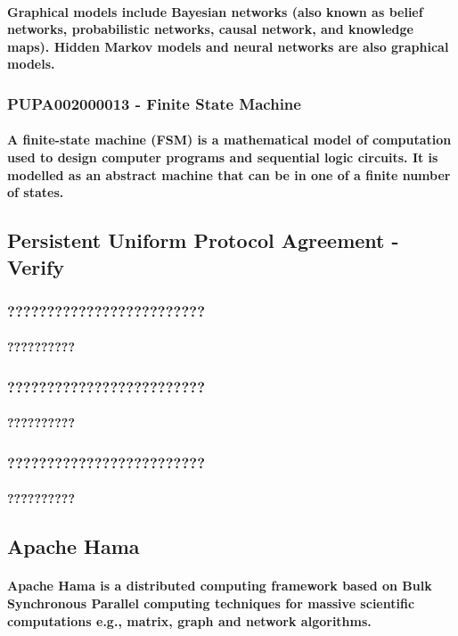 \documentclass{acm_proc_article-sp}
\begin{document}
\paragraph{Graphical models include Bayesian networks (also known as belief networks, probabilistic networks, causal network, and knowledge maps). Hidden Markov models and neural networks are also graphical models.}
\subsubsection{PUPA002000013 - Finite State Machine}
\paragraph{A finite-state machine (FSM) is a mathematical model of computation used to design computer programs and sequential logic circuits. It is modelled as an abstract machine that can be in one of a finite number of states.}
\subsection{Persistent Uniform Protocol Agreement - Verify}
\subsubsection{?????????????????????????}
\paragraph{??????????}
\subsubsection{?????????????????????????}
\paragraph{??????????}
\subsubsection{?????????????????????????}
\paragraph{??????????}
\subsection{Apache Hama}
\paragraph{Apache Hama is a distributed computing framework based on Bulk Synchronous Parallel computing techniques for massive scientific computations e.g., matrix, graph and network algorithms.\cite{seo2010hama}}
\end{document}
